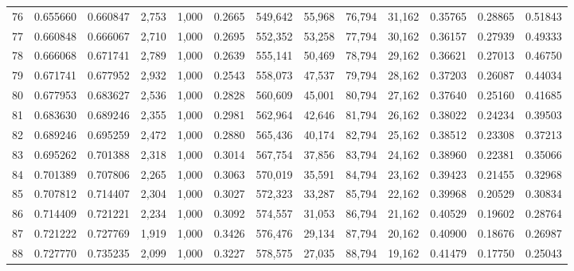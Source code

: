 \begin{tabular}{rrrrrrrrrrrrr}
76  &  0.655660 &  0.660847 &   2,753 &  1,000 &                                     0.2665 &  549,642 &   55,968 &   76,794 &   31,162 &  0.35765 &  0.28865 &  0.51843 \\
77  &  0.660848 &  0.666067 &   2,710 &  1,000 &                                     0.2695 &  552,352 &   53,258 &   77,794 &   30,162 &  0.36157 &  0.27939 &  0.49333 \\
78  &  0.666068 &  0.671741 &   2,789 &  1,000 &                                     0.2639 &  555,141 &   50,469 &   78,794 &   29,162 &  0.36621 &  0.27013 &  0.46750 \\
79  &  0.671741 &  0.677952 &   2,932 &  1,000 &                                     0.2543 &  558,073 &   47,537 &   79,794 &   28,162 &  0.37203 &  0.26087 &  0.44034 \\
80  &  0.677953 &  0.683627 &   2,536 &  1,000 &                                     0.2828 &  560,609 &   45,001 &   80,794 &   27,162 &  0.37640 &  0.25160 &  0.41685 \\
81  &  0.683630 &  0.689246 &   2,355 &  1,000 &                                     0.2981 &  562,964 &   42,646 &   81,794 &   26,162 &  0.38022 &  0.24234 &  0.39503 \\
82  &  0.689246 &  0.695259 &   2,472 &  1,000 &                                     0.2880 &  565,436 &   40,174 &   82,794 &   25,162 &  0.38512 &  0.23308 &  0.37213 \\
83  &  0.695262 &  0.701388 &   2,318 &  1,000 &                                     0.3014 &  567,754 &   37,856 &   83,794 &   24,162 &  0.38960 &  0.22381 &  0.35066 \\
84  &  0.701389 &  0.707806 &   2,265 &  1,000 &                                     0.3063 &  570,019 &   35,591 &   84,794 &   23,162 &  0.39423 &  0.21455 &  0.32968 \\
85  &  0.707812 &  0.714407 &   2,304 &  1,000 &                                     0.3027 &  572,323 &   33,287 &   85,794 &   22,162 &  0.39968 &  0.20529 &  0.30834 \\
86  &  0.714409 &  0.721221 &   2,234 &  1,000 &                                     0.3092 &  574,557 &   31,053 &   86,794 &   21,162 &  0.40529 &  0.19602 &  0.28764 \\
87  &  0.721222 &  0.727769 &   1,919 &  1,000 &                                     0.3426 &  576,476 &   29,134 &   87,794 &   20,162 &  0.40900 &  0.18676 &  0.26987 \\
88  &  0.727770 &  0.735235 &   2,099 &  1,000 &                                     0.3227 &  578,575 &   27,035 &   88,794 &   19,162 &  0.41479 &  0.17750 &  0.25043 \\

\end{tabular}
